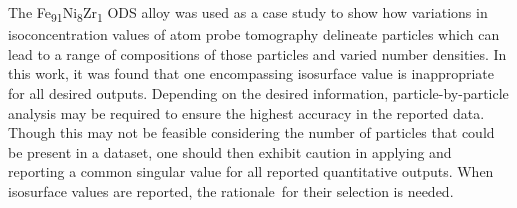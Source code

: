 	
	The Fe\textsubscript{91}Ni\textsubscript{8}Zr\textsubscript{1} ODS alloy was used as a case study to show how variations in isoconcentration values of atom probe tomography delineate particles which can lead to a range of compositions of those particles and varied number densities. In this work, it was found that one encompassing isosurface value is inappropriate for all desired outputs. Depending on the desired information, particle-by-particle analysis may be required to ensure the highest accuracy in the reported data. Though this may not be feasible considering the number of particles that could be present in a dataset, one should then exhibit caution in applying and reporting a common singular value for all reported quantitative outputs. When isosurface values are reported, the rationale\ for their selection is needed. 

